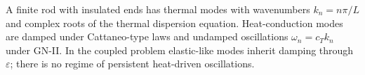 \begin{summarybox}[Summary]
A finite rod with insulated ends has thermal modes with wavenumbers $k_n=n\pi/L$ and complex roots of the thermal dispersion equation. Heat-conduction modes are damped under Cattaneo-type laws and undamped oscillations $\omega_n=c_Tk_n$ under GN-II. In the coupled problem elastic-like modes inherit damping through $\varepsilon$; there is no regime of persistent heat-driven oscillations.
\end{summarybox}
